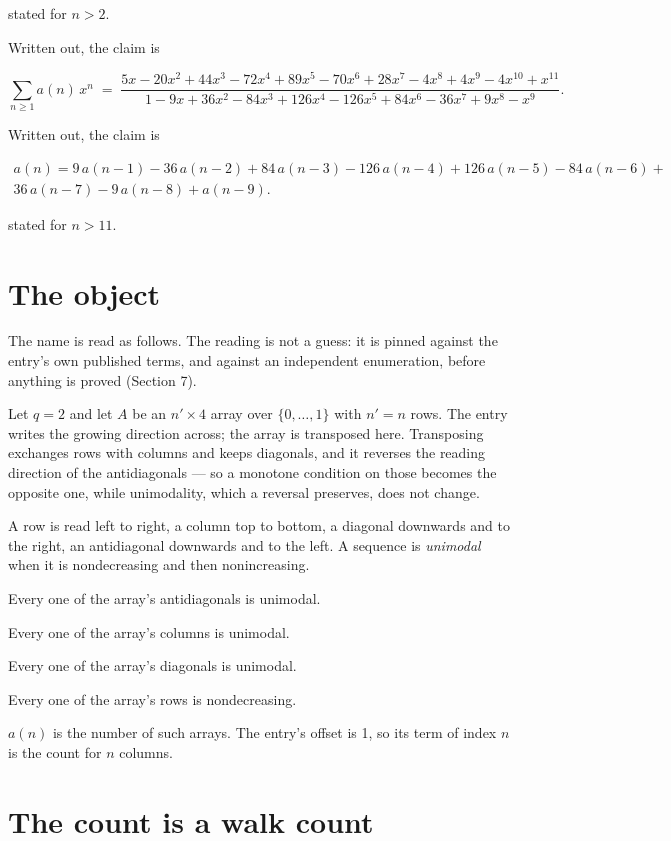 \documentclass[11pt]{article}
\theoremstyle{definition}
\begin{document}
stated for $n > 2$.

Written out, the claim is

\[\sum_{n \ge 1} a(n)\,x^n \;=\; \frac{5x - 20x^{2} + 44x^{3} - 72x^{4} + 89x^{5} - 70x^{6} + 28x^{7} - 4x^{8} + 4x^{9} - 4x^{10} + x^{11}}{1 - 9x + 36x^{2} - 84x^{3} + 126x^{4} - 126x^{5} + 84x^{6} - 36x^{7} + 9x^{8} - x^{9}}.\]

Written out, the claim is

\begin{multline*} a(n) = 9\,a(n-1) - 36\,a(n-2) + 84\,a(n-3) - 126\,a(n-4) + 126\,a(n-5) - 84\,a(n-6) + \\ 36\,a(n-7) - 9\,a(n-8) + a(n-9). \end{multline*}

stated for $n > 11$.

\section{The object}

The name is read as follows. The reading is not a guess: it is pinned against the entry's own published terms, and against an independent enumeration, before anything is proved (Section 7).

Let $q = 2$ and let $A$ be an $n' \times 4$ array over $\{0,\dots,1\}$ with $n' = n$ rows. The entry writes the growing direction across; the array is transposed here. Transposing exchanges rows with columns and keeps diagonals, and it reverses the reading direction of the antidiagonals --- so a monotone condition on those becomes the opposite one, while unimodality, which a reversal preserves, does not change.

A row is read left to right, a column top to bottom, a diagonal downwards and to the right, an antidiagonal downwards and to the left. A sequence is {\itshape unimodal} when it is nondecreasing and then nonincreasing.

Every one of the array's antidiagonals is unimodal.

Every one of the array's columns is unimodal.

Every one of the array's diagonals is unimodal.

Every one of the array's rows is nondecreasing.

$a(n)$ is the number of such arrays. The entry's offset is 1, so its term of index $n$ is the count for $n$ columns.

\section{The count is a walk count}
\end{document}

